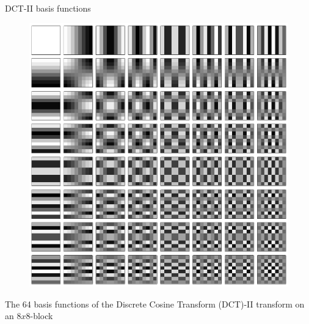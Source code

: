 \begin{frame} {DCT-II basis functions}
\begin{figure}
\includegraphics[width=.35\textwidth]{DCT8x8Basis.png}
\end{figure}
\bit
\item The 64 basis functions of the Discrete Cosine Transform (DCT)-II transform on an $8x8$-block
\eit
\end{frame}

%
%
%
%
%
%

